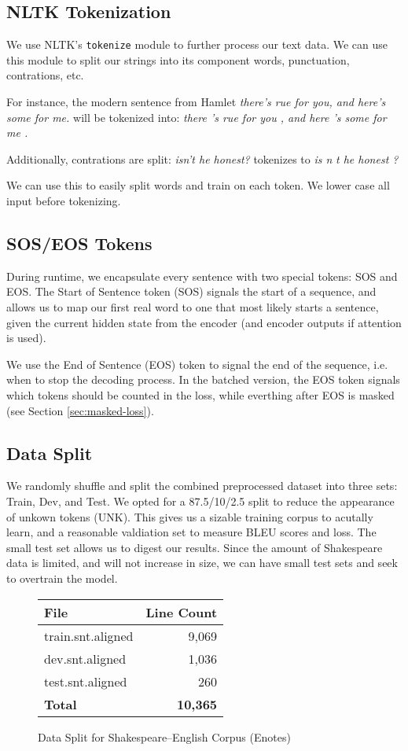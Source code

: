 \documentclass[twoside,twocolumn]{article}
\begin{document}
\subsection{NLTK Tokenization}
We use NLTK's \texttt{tokenize} module to further process our text data.
We can use this module to split our strings into its component words,
punctuation, contrations, etc.

For instance, the modern sentence from Hamlet
\emph{there's rue for you, and here's some for me.} will be tokenized into:
\emph{there 's rue for you , and here 's some for me .}

Additionally, contrations are split: \emph{isn't he honest?} tokenizes to
\emph{is n \textquotesingle} \emph{t he honest ?}

We can use this to easily split words and train on each token. We lower case
all input before tokenizing.
\subsection{SOS/EOS Tokens}
During runtime, we encapsulate every sentence with two special tokens:
SOS and EOS. The Start of Sentence token (SOS) signals the start of a
sequence, and allows us to map our first real word to one that most likely
starts a sentence, given the current hidden state from the encoder
(and encoder outputs if attention is used).

We use the End of Sentence (EOS) token to signal the end of the sequence, i.e.
when to stop the decoding process. In the batched version, the EOS token
signals which tokens should be counted in the loss, while everthing after EOS
is masked (see Section \ref{sec:masked-loss}).
\subsection{Data Split}
We randomly shuffle and split the combined preprocessed dataset into three sets:
Train, Dev, and Test. We opted for a 87.5/10/2.5 split to reduce the appearance
of unkown tokens (UNK). This gives us a sizable training corpus to acutally
learn, and a reasonable valdiation set to measure BLEU scores and loss. The
small test set allows us to digest our results. Since the amount of Shakespeare
data is limited, and will not increase in size, we can have small test sets and
seek to overtrain the model.
\begin{figure}[ht]
    \centering
    \begin{tabular}{ |l|r| }
        \hline
        \textbf{File}
          & \textbf{Line Count}\\
        \hline
        train.snt.aligned & 9,069 \\ \hline
        dev.snt.aligned & 1,036 \\ \hline
        test.snt.aligned & 260 \\ \hline
        \textbf{Total} & \textbf{10,365} \\ \hline
    \end{tabular}

    \caption{Data Split for Shakespeare--English Corpus (Enotes)}
    \label{fig:data-lines-enotes}
\end{figure}
\end{document}
